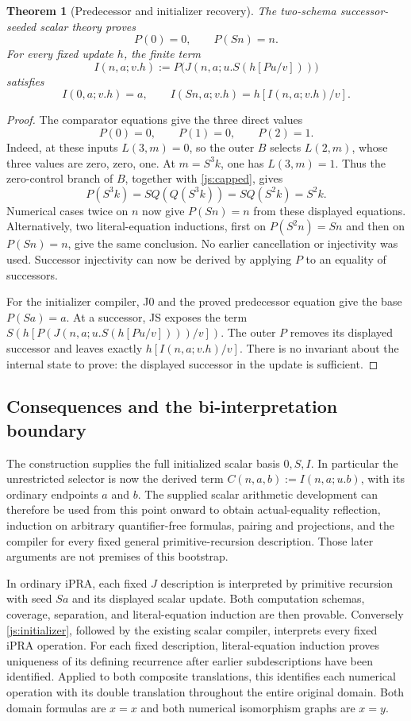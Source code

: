 \documentclass[11pt]{article}
\newtheorem{theorem}{Theorem}[section]
\theoremstyle{definition}
\begin{document}
\begin{theorem}[Predecessor and initializer recovery]\label{js:recovery}
The two-schema successor-seeded scalar theory proves
\[
 P(0)=0,\qquad P(Sn)=n.
\]
For every fixed update $h$, the finite term
\[
 I(n,a;v.h):=
 P\bigl(J(n,a;u.S(h[Pu/v]))\bigr)
 \tag{Initializer compiler}\label{js:initializer}
\]
satisfies
\[
 I(0,a;v.h)=a,\qquad I(Sn,a;v.h)=h[I(n,a;v.h)/v].
\]
\end{theorem}
\begin{proof}
The comparator equations give the three direct values
\[
 P(0)=0,\qquad P(1)=0,\qquad P(2)=1.
\]
Indeed, at these inputs $L(3,m)=0$, so the outer $B$ selects
$L(2,m)$, whose three values are zero, zero, one.
At $m=S^3k$, one has $L(3,m)=1$.  Thus the zero-control branch
of $B$, together with \eqref{js:capped}, gives
\[
 P(S^3k)=S Q(Q(S^3k))=S Q(S^2k)=S^2k.
\]
Numerical cases twice on $n$ now give $P(Sn)=n$ from these displayed
equations.  Alternatively, two literal-equation inductions, first on
$P(S^2n)=Sn$ and then on $P(Sn)=n$, give the same conclusion.
No earlier cancellation or injectivity was used.  Successor injectivity
can now be derived by applying $P$ to an equality of successors.

For the initializer compiler, J0 and the proved predecessor equation
give the base $P(Sa)=a$.  At a successor, JS exposes the term
$S(h[P(J(n,a;u.S(h[Pu/v])))/v])$.  The outer $P$ removes its
displayed successor and leaves exactly $h[I(n,a;v.h)/v]$.
There is no invariant about the internal state to prove: the displayed
successor in the update is sufficient.
\end{proof}

\subsection{Consequences and the bi-interpretation boundary}

The construction supplies the full initialized scalar basis $0,S,I$.
In particular the unrestricted selector is now the derived term
$C(n,a,b):=I(n,a;u.b)$, with its ordinary endpoints $a$ and $b$.
The supplied scalar arithmetic development can therefore be used from
this point onward to obtain actual-equality reflection, induction on
arbitrary quantifier-free formulas, pairing and projections, and the
compiler for every fixed general primitive-recursion description.
Those later arguments are not premises of this bootstrap.

In ordinary iPRA, each fixed $J$ description is interpreted by primitive
recursion with seed $Sa$ and its displayed scalar update.  Both
computation schemas, coverage, separation, and literal-equation induction
are then provable.  Conversely \eqref{js:initializer}, followed by the
existing scalar compiler, interprets every fixed iPRA operation.
For each fixed description, literal-equation induction proves uniqueness
of its defining recurrence after earlier subdescriptions have been
identified.  Applied to both composite translations, this identifies
each numerical operation with its double translation throughout the
entire original domain.  Both domain formulas are $x=x$ and both
numerical isomorphism graphs are $x=y$.
\end{document}
